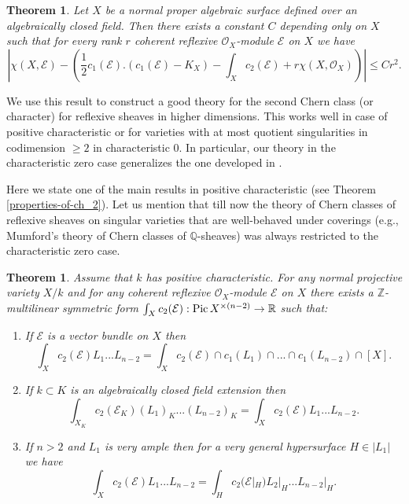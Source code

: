 \documentclass[twoside, 11pt]{article}
\theoremstyle{plain}
\newtheorem{Theorem}[Thm]{\sc Theorem}
\theoremstyle{definition}
\theoremstyle{remark}
\newcommand{\ZZ}{{\mathbb Z}}
\newcommand{\QQ}{{\mathbb Q}}
\newcommand{\RR}{{\mathbb R}}
\newcommand{\cE}{{\mathcal E}}
\newcommand{\cO}{{\mathcal O}}
\newcommand{\Pic}{{\mathop{\rm Pic \, }}}
\begin{document}
\begin{Theorem}\label{main2}
	Let $X$ be a normal proper algebraic surface defined over an algebraically closed field.
	Then there exists a constant $C$ depending only on $X$ such that for every rank $r$  coherent reflexive $\cO_X$-module $\cE$ on $X$ we have
	$$\left|\chi (X, \cE) -\left(\frac {1}{2}c_1 (\cE). (c_1(\cE) -K_X)- \int_Xc_2 (\cE) +r\chi (X, \cO_X)\right)\right|\le C r^2.$$
\end{Theorem}

We use this result to construct a good theory for the second Chern class (or character) for reflexive sheaves in higher dimensions. This works well in case of positive characteristic or for varieties with at most quotient singularities in codimension $\ge 2$ in characteristic $0$. In particular, our theory in the characteristic zero case generalizes the one developed in \cite[Section 3]{GKPT}. 

Here we state one of the main results in positive characteristic (see Theorem
\ref{properties-of-ch_2}). Let us mention that till now  the theory of Chern classes of reflexive sheaves on singular varieties that are well-behaved under coverings (e.g., Mumford's theory of Chern classes of $\QQ$-sheaves) was always restricted to the characteristic zero case.



\begin{Theorem}\label{main3}
Assume that $k$ has positive characteristic. For any normal projective variety $X/k$ and for any 
coherent reflexive $\cO_X$-module $\cE$ on $X$ there exists a $\ZZ$-multilinear symmetric 
form $\int _X c _2 (\cE): \Pic X ^{\times (n-2)}\to \RR$ such that:
\begin{enumerate}
\item If $\cE$ is a vector bundle on $X$ then $$\int _X c _2 (\cE)L_1...L_{n-2}=\int_X c _2 (\cE)\cap c_1(L_1)\cap ...\cap c_1(L_{n-2})\cap[X].$$
\item If $k\subset K$ is an algebraically closed field extension then 
$$\int _{X_K} c _2 (\cE_K)(L_1)_K...(L_{n-2})_K=\int _X c _2 (\cE)L_1...L_{n-2}.$$
\item If $n>2$ and  $ L_1$ is very ample then for a very general hypersurface $H\in |L_1|$ we have
$$\int _X c_2 (\cE)L_1...L_{n-2}=\int _{H}c_2 (\cE|_{H})L_2|_{H}...L_{n-2}|_{H}.$$
\end{enumerate}
\end{Theorem}
\end{document}
